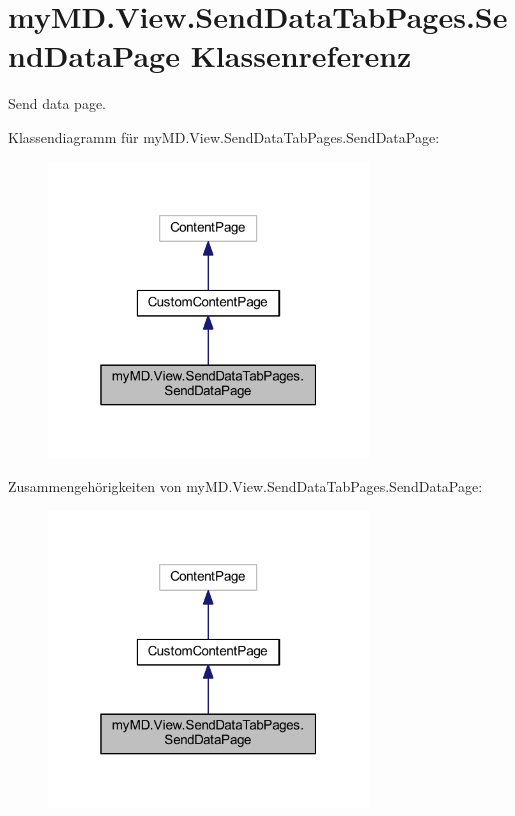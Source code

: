 \hypertarget{classmy_m_d_1_1_view_1_1_send_data_tab_pages_1_1_send_data_page}{}\section{my\+M\+D.\+View.\+Send\+Data\+Tab\+Pages.\+Send\+Data\+Page Klassenreferenz}
\label{classmy_m_d_1_1_view_1_1_send_data_tab_pages_1_1_send_data_page}


Send data page.  




Klassendiagramm für my\+M\+D.\+View.\+Send\+Data\+Tab\+Pages.\+Send\+Data\+Page\+:\nopagebreak
\begin{figure}[H]
\begin{center}
\leavevmode
\includegraphics[width=241pt]{classmy_m_d_1_1_view_1_1_send_data_tab_pages_1_1_send_data_page__inherit__graph}
\end{center}
\end{figure}


Zusammengehörigkeiten von my\+M\+D.\+View.\+Send\+Data\+Tab\+Pages.\+Send\+Data\+Page\+:\nopagebreak
\begin{figure}[H]
\begin{center}
\leavevmode
\includegraphics[width=241pt]{classmy_m_d_1_1_view_1_1_send_data_tab_pages_1_1_send_data_page__coll__graph}
\end{center}
\end{figure}
